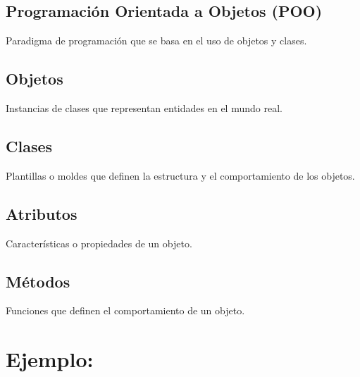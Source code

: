 \documentclass[
  a4paper,
  onepage,
  openany]{scrreprt}
\begin{document}
\hypertarget{programaciuxf3n-orientada-a-objetos-poo}{%
\subsection{Programación Orientada a Objetos
(POO)}\label{programaciuxf3n-orientada-a-objetos-poo}}

Paradigma de programación que se basa en el uso de objetos y clases.

\hypertarget{objetos}{%
\subsection{Objetos}\label{objetos}}

Instancias de clases que representan entidades en el mundo real.

\hypertarget{clases}{%
\subsection{Clases}\label{clases}}

Plantillas o moldes que definen la estructura y el comportamiento de los
objetos.

\hypertarget{atributos}{%
\subsection{Atributos}\label{atributos}}

Características o propiedades de un objeto.

\hypertarget{muxe9todos}{%
\subsection{Métodos}\label{muxe9todos}}

Funciones que definen el comportamiento de un objeto.

\hypertarget{ejemplo-48}{%
\section{Ejemplo:}\label{ejemplo-48}}
\end{document}
